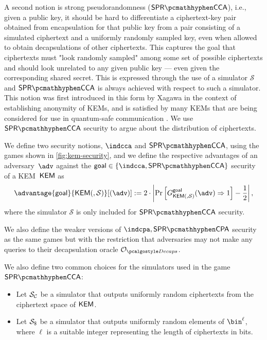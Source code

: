 A second notion is strong pseudorandomness ($\sprcca$), i.e., given a public key, it should be hard to differentiate a ciphertext-key pair obtained from encapsulation for that public key from a pair consisting of a simulated ciphertext and a uniformly randomly sampled key, even when allowed to obtain decapsulations of other ciphertexts.
This captures the goal that ciphertexts must "look randomly sampled" among some set of possible ciphertexts and should look unrelated to any given public key --- even given the corresponding shared secret.
This is expressed through the use of a simulator $\mathcal S$ and $\sprcca$ is always achieved with respect to such a simulator.
This notion was first introduced in this form by Xagawa \cite{EC:Xagawa22} in the context of establishing anonymity of KEMs, and is satisfied by many KEMs that are being considered for use in quantum-safe communication \cite{EC:Xagawa22}. We use $\sprcca$ security to argue about the distribution of ciphertexts.

\begin{definition} \label{def:kem-security}
    We define two security notions, $\indcca$ and $\sprcca$, using the games shown in \cref{fig:kem-security}, and we define the respective advantages of an adversary~$\adv$ against the $\mathsf{goal} \in \{\indcca, \sprcca\}$ security of a KEM~$\mathsf{KEM}$ as
    \[
        \advantage{\mathsf{goal}}{\KEM(, \mathcal{S})}[(\adv)] := 2 \cdot \left| \Pr \left[ G^{\mathsf{goal}}_{\KEM(, \mathcal{S})}(\adv) \Rightarrow 1 \right] - \frac{1}{2} \right|,
    \]
    where the simulator $\mathcal{S}$ is only included for $\sprcca$ security.

    We also define the weaker versions of $\indcpa,\sprcpa$ security as the same games but with the restriction that adversaries may not make any queries to their decapsulation oracle $\decapsoracle$.

    We also define two common choices for the simulators used in the game $\sprcca$: \begin{itemize}
        \item Let $\mathcal{S}_\mathcal{C}$ be a simulator that outputs uniformly random ciphertexts from the ciphertext space of $\mathsf{KEM}$.
        \item Let $\simulbin$ be a simulator that outputs uniformly random elements of $\bin^\ell$, where $\ell$ is a suitable integer representing the length of ciphertexts in bits.
    \end{itemize}
\end{definition}

